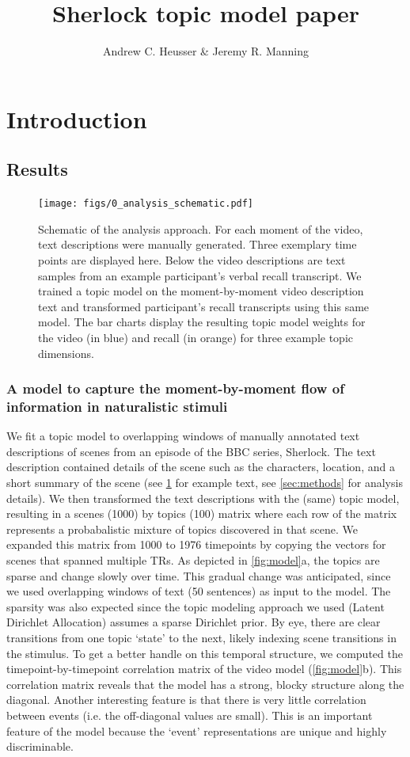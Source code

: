\documentclass[a4paper,man,natbib,floatsintext]{apa6}
\title{Sherlock topic model paper}
\author{Andrew C. Heusser \& Jeremy R. Manning}
\affiliation{Dartmouth College}
\begin{document}
\maketitle

\section{Introduction}

\subsection{Results}

\begin{figure}[t!]
\centering
\texttt{[image: figs/0\_analysis\_schematic.pdf]}
\caption{\label{fig:schematic}Schematic of the analysis approach. For each moment of the video, text descriptions were manually generated. Three exemplary time points are displayed here.  Below the video descriptions are text samples from an example participant's verbal recall transcript.  We trained a topic model on the moment-by-moment video description text and transformed participant's recall transcripts using this same model. The bar charts display the resulting topic model weights for the video (in blue) and recall (in orange) for three example topic dimensions.}
\end{figure}

\subsubsection{A model to capture the moment-by-moment flow of information in naturalistic stimuli}
We fit a topic model to overlapping windows of manually annotated text descriptions of scenes from an episode of the BBC series, Sherlock. The text description contained details of the scene such as the characters, location, and a short summary of the scene (see \ref{fig:schematic} for example text, see \ref{sec:methods} for analysis details). We then transformed the text descriptions with the (same) topic model, resulting in a scenes (1000) by topics (100) matrix where each row of the matrix represents a probabalistic mixture of topics discovered in that scene. We expanded this matrix from 1000 to 1976 timepoints by copying the vectors for scenes that spanned multiple TRs. As depicted in \ref{fig:model}a, the topics are sparse and change slowly over time. This gradual change was anticipated, since we used overlapping windows of text (50 sentences) as input to the model. The sparsity was also expected since the topic modeling approach we used (Latent Dirichlet Allocation) assumes a sparse Dirichlet prior. By eye, there are clear transitions from one topic `state' to the next, likely indexing scene transitions in the stimulus.  To get a better handle on this temporal structure, we computed the timepoint-by-timepoint correlation matrix of the video model (\ref{fig:model}b).  This correlation matrix reveals that the model has a strong, blocky structure along the diagonal.  Another interesting feature is that there is very little correlation between events (i.e. the off-diagonal values are small). This is an important feature of the model because the `event' representations are unique and highly discriminable.
\end{document}

